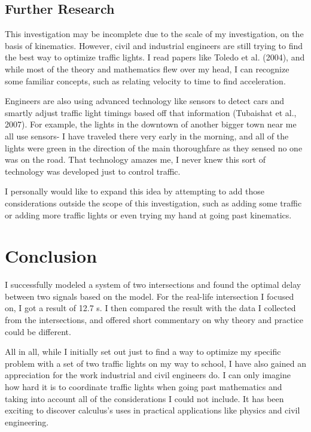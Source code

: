 \documentclass[11pt]{article}
\begin{document}
\subsection{Further Research}

This investigation may be incomplete due to the scale of my investigation, on the basis of kinematics. However, civil and industrial engineers are still trying to find the best way to optimize traffic lights. I read papers like Toledo et al. (2004), and while most of the theory and mathematics flew over my head, I can recognize some familiar concepts, such as relating velocity to time to find acceleration.

Engineers are also using advanced technology like sensors to detect cars and smartly adjust traffic light timings based off that information (Tubaishat et al., 2007). For example, the lights in the downtown of another bigger town near me all use sensors- I have traveled there very early in the morning, and all of the lights were green in the direction of the main thoroughfare as they sensed no one was on the road. That technology amazes me, I never knew this sort of technology was developed just to control traffic. 

I personally would like to expand this idea by attempting to add those considerations outside the scope of this investigation, such as adding some traffic or adding more traffic lights or even trying my hand at going past kinematics.

\section{Conclusion}

  I successfully modeled a system of two intersections and found the optimal delay between two signals based on the model. For the real-life intersection I focused on, I got a result of 12.7 s. I then compared the result with the data I collected from the intersections, and offered short commentary on why theory and practice could be different.
  
  All in all, while I initially set out just to find a way to optimize my specific problem with a set of two traffic lights on my way to school, I have also gained an appreciation for the work industrial and civil engineers do. I can only imagine how hard it is to coordinate traffic lights when going past mathematics and taking into account all of the considerations I could not include. It has been exciting to discover calculus's uses in practical applications like physics and civil engineering.
\end{document}
